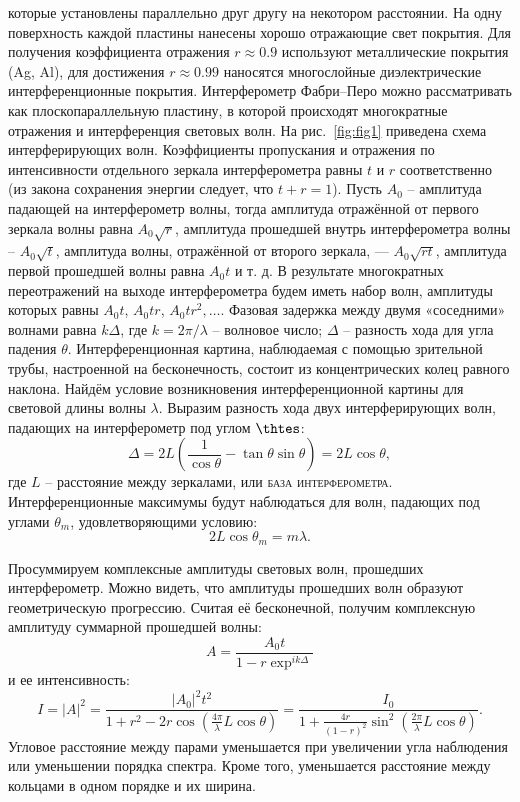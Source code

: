 \documentclass[12pt]{article}
\begin{document}
    которые установлены параллельно друг другу на некотором расстоянии.
    На одну поверхность каждой пластины нанесены хорошо отражающие свет покрытия.
    Для получения коэффициента отражения $r \approx 0.9$
    используют металлические покрытия (Ag, Al), для достижения $r \approx 0.99$
    наносятся многослойные диэлектрические интерференционные покрытия.
    Интерферометр Фабри–Перо можно рассматривать как плоскопараллельную пластину,
    в которой происходят многократные отражения и интерференция световых волн.
    На рис.\ \ref{fig:fig1} приведена схема интерферирующих волн.
    Коэффициенты пропускания и отражения по интенсивности отдельного зеркала интерферометра
    равны $t$ и $r$ соответственно (из закона сохранения энергии следует, что $t + r = 1$).
    Пусть $A_0$ -- амплитуда падающей на интерферометр волны,
    тогда амплитуда отражённой от первого зеркала волны равна $A_0\sqrt{r}$,
    амплитуда прошедшей внутрь интерферометра волны -- $A_0\sqrt{t}$,
    амплитуда волны, отражённой от второго зеркала, — $A_0\sqrt{rt}$,
    амплитуда первой прошедшей волны равна $A_0t$ и т. д.
    В результате многократных переотражений на выходе интерферометра будем иметь набор волн,
    амплитуды которых равны $A_0t$, $A_0tr$, $A_0tr^2, \dots$.
    Фазовая задержка между двумя «соседними» волнами равна $k\Delta$, где $k = 2\pi/\lambda$
    -- волновое число; $\Delta$ -- разность хода для угла падения $\theta$.
    Интерференционная картина, наблюдаемая с помощью зрительной трубы, настроенной на бесконечность,
    состоит из концентрических колец равного наклона.
    Найдём условие возникновения интерференционной картины для световой длины волны $\lambda$.
    Выразим разность хода двух интерферирующих волн, падающих на интерферометр под углом $\thtes$:
    \begin{equation}
        \Delta = 2L\left(\frac{1}{\cos\theta} - \tan\theta \sin\theta\right) = 2L\cos\theta,
        \label{eq:eq1}
    \end{equation}
    где $L$ -- расстояние между зеркалами, или \textsc{база интерферометра}.
    Интерференционные максимумы будут наблюдаться для волн, падающих под углами $\theta_m$,
    удовлетворяющими условию:
    \begin{equation}
        2L \cos\theta_m = m \lambda.
        \label{eq:eq2}
    \end{equation}

    Просуммируем комплексные амплитуды световых волн, прошедших интерферометр.
    Можно видеть, что амплитуды прошедших волн образуют геометрическую прогрессию.
    Считая её бесконечной, получим комплексную амплитуду суммарной прошедшей волны:
    \[A = \frac{A_0t}{1 - r \exp^{ik\Delta}}\]
    и ее интенсивность:
    \begin{equation}
        I = |A|^2 = \frac{|A_0|^2t^2}{1 + r^2 - 2r\cos(\frac{4\pi}{\lambda}L\cos\theta)} =
        \frac{I_0}{1 + \frac{4r}{(1 - r)^2} \sin^2(\frac{2\pi}{\lambda}L\cos\theta)}.
        \label{eq:eq3}
    \end{equation}
    Угловое расстояние между парами уменьшается при увеличении угла наблюдения или уменьшении порядка спектра.
    Кроме того, уменьшается расстояние между кольцами в одном порядке и их ширина.
\end{document}
